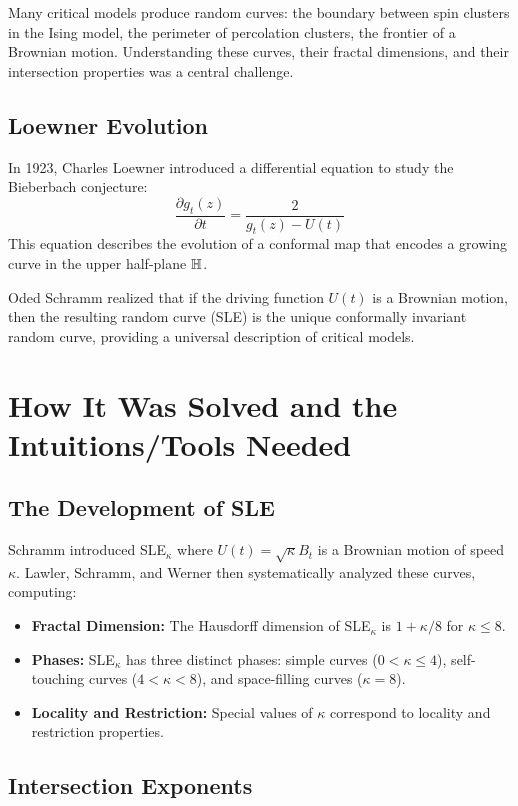 Many critical models produce random curves: the boundary between spin clusters in the Ising model, the perimeter of percolation clusters, the frontier of a Brownian motion. Understanding these curves, their fractal dimensions, and their intersection properties was a central challenge.

\subsection{Loewner Evolution}

In 1923, Charles Loewner introduced a differential equation to study the Bieberbach conjecture:
\[
\frac{\partial g_t(z)}{\partial t} = \frac{2}{g_t(z) - U(t)}
\]
This equation describes the evolution of a conformal map that encodes a growing curve in the upper half-plane $\H$.

Oded Schramm realized that if the driving function $U(t)$ is a Brownian motion, then the resulting random curve (SLE) is the unique conformally invariant random curve, providing a universal description of critical models.

\section{How It Was Solved and the Intuitions/Tools Needed}

\subsection{The Development of SLE}

Schramm introduced SLE$_\kappa$ where $U(t) = \sqrt{\kappa} B_t$ is a Brownian motion of speed $\kappa$. Lawler, Schramm, and Werner then systematically analyzed these curves, computing:
\begin{itemize}
    \item \textbf{Fractal Dimension:} The Hausdorff dimension of SLE$_\kappa$ is $1 + \kappa/8$ for $\kappa \leq 8$.
    \item \textbf{Phases:} SLE$_\kappa$ has three distinct phases: simple curves ($0 < \kappa \leq 4$), self-touching curves ($4 < \kappa < 8$), and space-filling curves ($\kappa = 8$).
    \item \textbf{Locality and Restriction:} Special values of $\kappa$ correspond to locality and restriction properties.
\end{itemize}

\subsection{Intersection Exponents}


